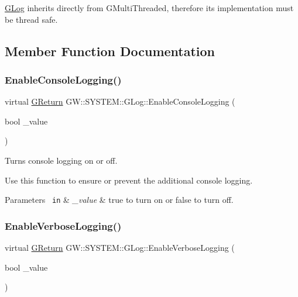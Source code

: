 \mbox{\hyperlink{classGW_1_1SYSTEM_1_1GLog}{G\+Log}} inherits directly from G\+Multi\+Threaded, therefore its implementation must be thread safe. 

\subsection{Member Function Documentation}
\mbox{\label{classGW_1_1SYSTEM_1_1GLog_a1eb651aa3d5b6b8baac389be284a569d}} 
\subsubsection{\texorpdfstring{EnableConsoleLogging()}{EnableConsoleLogging()}}
{\footnotesize\ttfamily virtual \mbox{\hyperlink{namespaceGW_a67a839e3df7ea8a5c5686613a7a3de21}{G\+Return}} G\+W\+::\+S\+Y\+S\+T\+E\+M\+::\+G\+Log\+::\+Enable\+Console\+Logging (\begin{DoxyParamCaption}\item[{bool}]{\+\_\+value }\end{DoxyParamCaption})\hspace{0.3cm}{\ttfamily [pure virtual]}}



Turns console logging on or off. 

Use this function to ensure or prevent the additional console logging.


\begin{DoxyParams}[1]{Parameters}
\mbox{\texttt{ in}}  & {\em \+\_\+value} & true to turn on or false to turn off. \\
\hline
\end{DoxyParams}
\mbox{\label{classGW_1_1SYSTEM_1_1GLog_adea469091bba33b419f7e88a9c2c3049}} 
\subsubsection{\texorpdfstring{EnableVerboseLogging()}{EnableVerboseLogging()}}
{\footnotesize\ttfamily virtual \mbox{\hyperlink{namespaceGW_a67a839e3df7ea8a5c5686613a7a3de21}{G\+Return}} G\+W\+::\+S\+Y\+S\+T\+E\+M\+::\+G\+Log\+::\+Enable\+Verbose\+Logging (\begin{DoxyParamCaption}\item[{bool}]{\+\_\+value }\end{DoxyParamCaption})\hspace{0.3cm}{\ttfamily [pure virtual]}}



